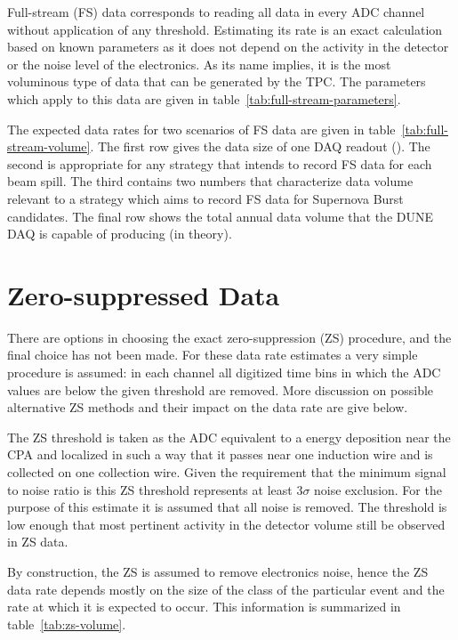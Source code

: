 Full-stream (FS) data corresponds to reading all data in every ADC channel without application of any threshold.
Estimating its rate is an exact calculation based on known parameters as it does not depend on
the activity in the detector or the noise level of the electronics.
As its name implies, it is the most voluminous type of data that can be generated by the TPC.
The parameters which apply to this data are given in table~\ref{tab:full-stream-parameters}.



The expected data rates for two scenarios of FS data are given
in table~\ref{tab:full-stream-volume}.
The first row gives the data size of one DAQ readout (\daqreadouttime).
The second is appropriate for any strategy that intends to record FS
data for each beam spill.
The third contains two numbers that characterize data volume relevant to a strategy which aims to record FS data
for Supernova Burst candidates.
The final row  shows the total annual data volume that the DUNE DAQ is capable of producing (in theory).




\section{Zero-suppressed Data}

There are options in choosing the exact zero-suppression (ZS) procedure,
and the final choice has not been made.
For these data rate estimates a very simple procedure is assumed: in each
channel all digitized time bins in which the ADC values are below
the given threshold are removed.
More discussion on possible alternative ZS methods and their impact on
the data rate are give below.

The ZS threshold is taken as the ADC equivalent to a
\chargezsthreshold
energy deposition near the CPA and localized in such a way that it passes near one
induction wire and is collected on one collection wire.
Given the requirement that the minimum signal to noise ratio is
\chargeminsignalnoiseratio this ZS threshold represents at least $3\sigma$
noise exclusion.
For the purpose of this estimate it is assumed that all noise is
removed.
The threshold is low enough that most pertinent activity in the
detector volume still be observed in ZS data.




By construction, the ZS is assumed to remove electronics noise, hence
the ZS data rate depends mostly on the size of the class of the
particular event and the rate at which it is expected to occur.
This information is summarized in table~\ref{tab:zs-volume}.


